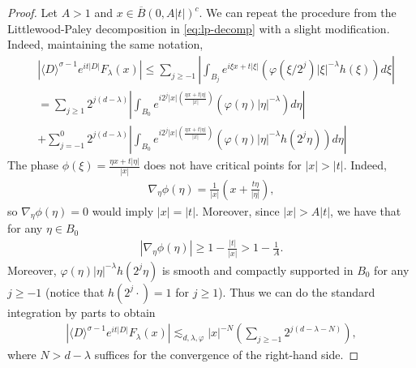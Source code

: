 \documentclass[10pt,a4paper]{amsart}
\begin{document}
\begin{proof}
Let $A > 1$ and $x \in \overline{B}(0,A|t|)^c$. We can repeat the procedure from the Littlewood-Paley decomposition in \eqref{eq:lp-decomp} with a slight modification. Indeed, maintaining the same notation,
\begin{align*}
&|\langle D \rangle^{\sigma-1} e^{it|D|} F_{\lambda}(x)| \leq \sum_{j \geq -1} \left| \int_{B_j} e^{i \xi x + t |\xi|}(\varphi(\xi/2^j) |\xi|^{-\lambda} h(\xi)) d\xi \right| \nonumber \\
&= \sum_{j \geq 1} 2^{j(d-\lambda)} \left| \int_{B_0} e^{i 2^j |x| (\frac{\eta x + t |\eta|}{|x|})}(\varphi(\eta) |\eta|^{-\lambda} ) d\eta \right| \nonumber \\
&+ \sum_{j=-1}^0 2^{j(d-\lambda)} \left| \int_{B_0} e^{i 2^j |x| (\frac{\eta x + t |\eta|}{|x|})}(\varphi(\eta) |\eta|^{-\lambda} h(2^j \eta)) d\eta \right|
\end{align*}
The phase $\phi(\xi) = \frac{\eta x + t |\eta|}{|x|}$ does not have critical points for $|x| > |t|$. Indeed,
\begin{align*}
\nabla_{\eta} \phi(\eta) = \frac{1}{|x|} \left( x + \frac{t \eta}{|\eta|} \right),
\end{align*}
so $\nabla_{\eta} \phi(\eta) = 0$ would imply $|x| = |t|$. Moreover, since $|x| > A |t|$, we have that for any $\eta \in B_0$
\begin{align*}
|\nabla_{\eta} \phi(\eta)| \geq 1 - \frac{|t|}{|x|} > 1 - \frac{1}{A}.
\end{align*}
Moreover, $\varphi(\eta) |\eta|^{-\lambda} h(2^j \eta)$ is smooth and compactly supported in $B_0$ for any $j \geq -1$ (notice that $h(2^j \cdot) = 1$ for $j \geq 1$).  Thus we can do the standard integration by parts to obtain
\begin{align*}
|\langle D \rangle^{\sigma-1} e^{it|D|} F_{\lambda}(x)| \lesssim_{d,\lambda,\varphi} |x|^{-N} \left( \sum_{j \geq -1} 2^{j(d-\lambda-N)} \right),
\end{align*}
where $N > d - \lambda$ suffices for the convergence of the right-hand side. %


\end{proof}
\end{document}
